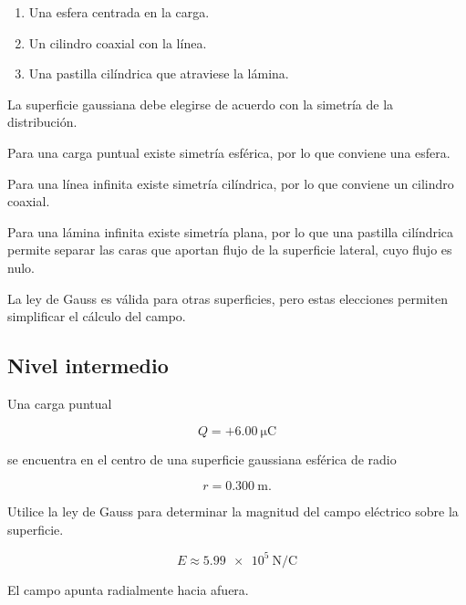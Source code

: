\begin{respuesta}

\begin{enumerate}
    \item Una esfera centrada en la carga.
    \item Un cilindro coaxial con la línea.
    \item Una pastilla cilíndrica que atraviese la lámina.
\end{enumerate}

\end{respuesta}

\begin{explicacion}

La superficie gaussiana debe elegirse de acuerdo con la simetría de la distribución.

Para una carga puntual existe simetría esférica, por lo que conviene una esfera.

Para una línea infinita existe simetría cilíndrica, por lo que conviene un cilindro
coaxial.

Para una lámina infinita existe simetría plana, por lo que una pastilla cilíndrica
permite separar las caras que aportan flujo de la superficie lateral, cuyo flujo es
nulo.

La ley de Gauss es válida para otras superficies, pero estas elecciones permiten
simplificar el cálculo del campo.

\end{explicacion}


\subsection{Nivel intermedio}

\begin{ejercicio}

Una carga puntual

\[
Q=+\SI{6.00}{\micro\coulomb}
\]

se encuentra en el centro de una superficie gaussiana esférica de radio

\[
r=\SI{0.300}{\metre}.
\]

Utilice la ley de Gauss para determinar la magnitud del campo eléctrico sobre la
superficie.

\end{ejercicio}

\begin{respuesta}

\[
\boxed{E\approx\SI{5.99e5}{\newton\per\coulomb}}
\]

El campo apunta radialmente hacia afuera.

\end{respuesta}


